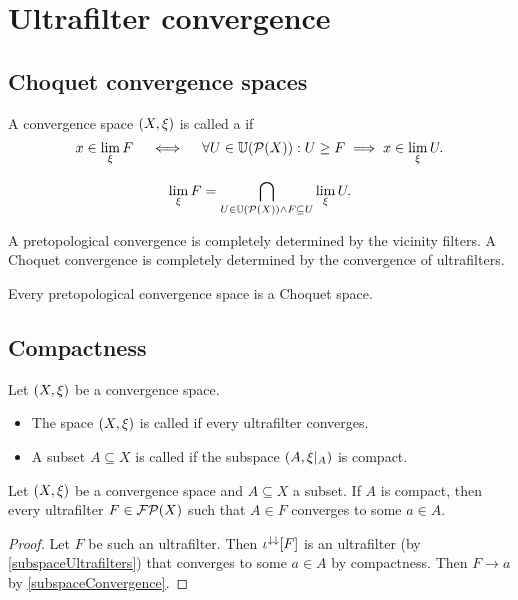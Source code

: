 \chapter{Ultrafilter convergence}
\section{Choquet convergence spaces}
\begin{definition}
A convergence space $\left( X, \xi \right)$ is called a  if
\[ x\in \lim_\xi F \quad\iff\quad \forall U\in \operatorname{\mathbb{U}}(\operatorname{\mathcal{P}}(X)): U \geq F \implies x\in\lim_\xi U. \]
\end{definition}

\[ \lim_\xi F = \bigcap_{U\in \operatorname{\mathbb{U}}(\operatorname{\mathcal{P}}(X))\land F \subseteq U}\lim_\xi U. \]

A pretopological convergence is completely determined by the vicinity filters. A Choquet convergence is completely determined by the convergence of ultrafilters.

\begin{lemma}
Every pretopological convergence space is a Choquet space.
\end{lemma}

\section{Compactness}
\begin{definition}
Let $\left( X,\xi \right)$ be a convergence space.
\begin{itemize}
\item The space $\left( X,\xi \right)$ is called  if every ultrafilter converges.
\item A subset $A\subseteq X$ is called  if the subspace $\left( A, \xi|_A \right)$ is compact.
\end{itemize}
\end{definition}

\begin{lemma} \label{ultrafilterConvergenceInCompactSubset}
Let $\left( X,\xi \right)$ be a convergence space and $A\subseteq X$ a subset. If $A$ is compact, then every ultrafilter $F\in \operatorname{\mathcal{FP}}(X)$ such that $A\in F$ converges to some $a\in A$.
\end{lemma}
\begin{proof}
Let $F$ be such an ultrafilter. Then $\iota^{\downarrow\downarrow}[F]$ is an ultrafilter (by \ref{subspaceUltrafilters}) that converges to some $a\in A$ by compactness. Then $F\to a$ by \ref{subspaceConvergence}.
\end{proof}

